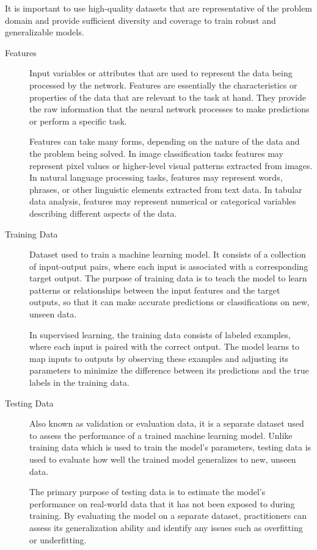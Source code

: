 \documentclass[a4paper]{report}
\begin{document}
It is important to use high-quality datasets that are representative of the problem domain and provide sufficient diversity and coverage to train robust and generalizable models.

\begin{description}
\item[Features]
Input variables or attributes that are used to represent the data being processed by the network. Features are essentially the characteristics or properties of the data that are relevant to the task at hand. They provide the raw information that the neural network processes to make predictions or perform a specific task.

Features can take many forms, depending on the nature of the data and the problem being solved. In image classification tasks features may represent pixel values or higher-level visual patterns extracted from images. In natural language processing tasks, features may represent words, phrases, or other linguistic elements extracted from text data. In tabular data analysis, features may represent numerical or categorical variables describing different aspects of the data.

\item[Training Data]
Dataset used to train a machine learning model. It consists of a collection of input-output pairs, where each input is associated with a corresponding target output. The purpose of training data is to teach the model to learn patterns or relationships between the input features and the target outputs, so that it can make accurate predictions or classifications on new, unseen data.

In supervised learning, the training data consists of labeled examples, where each input is paired with the correct output. The model learns to map inputs to outputs by observing these examples and adjusting its parameters to minimize the difference between its predictions and the true labels in the training data.

\item[Testing Data]
Also known as validation or evaluation data, it is a separate dataset used to assess the performance of a trained machine learning model. Unlike training data which is used to train the model's parameters, testing data is used to evaluate how well the trained model generalizes to new, unseen data. 

The primary purpose of testing data is to estimate the model's performance on real-world data that it has not been exposed to during training. By evaluating the model on a separate dataset, practitioners can assess its generalization ability and identify any issues such as overfitting or underfitting.


\end{description}
\end{document}
